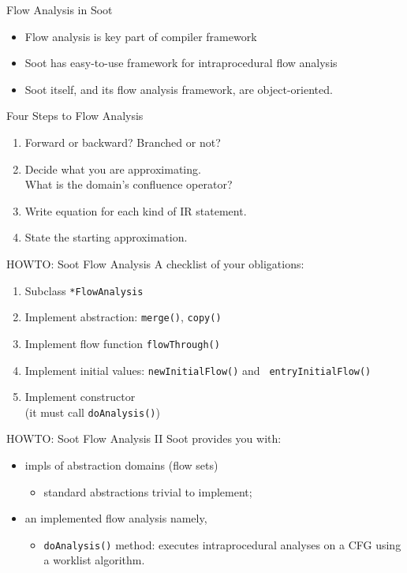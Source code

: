 \begin{slide}{Flow Analysis in Soot}
\vspace*{0.2in}
\begin{itemize}
\item Flow analysis is key part of compiler framework
\item Soot has easy-to-use framework for intraprocedural flow analysis
\item Soot itself, and its flow analysis framework, are object-oriented.
\end{itemize}
\end{slide}

\begin{slide}{Four Steps to Flow Analysis}
\begin{enumerate}
\item Forward or backward?  Branched or not?

\item Decide what you are approximating.\\
What is the domain's confluence operator?

\item Write equation for each kind of IR statement.

\item State the starting approximation.
\end{enumerate}
\end{slide}

\begin{slide}{HOWTO: Soot Flow Analysis}
A checklist of your obligations:
\begin{enumerate}
\item Subclass \verb+*FlowAnalysis+
\item Implement abstraction: {\tt merge()}, {\tt copy()}
\item Implement flow function {\tt flowThrough()}
\item Implement initial values: {\tt newInitialFlow()} and {\tt
entryInitialFlow()}
\item Implement constructor \\ \quad (it must call {\tt doAnalysis()})
\end{enumerate}
\end{slide}

\begin{slide}{HOWTO: Soot Flow Analysis II}
Soot provides you with:
\begin{itemize}
\item impls of abstraction domains (flow sets)
\begin{itemize}
\item standard abstractions trivial to implement;
\end{itemize}
\item an implemented flow analysis namely,
\begin{itemize}
\item {\tt doAnalysis()} method:
executes intraprocedural analyses on a
CFG using a worklist algorithm.
\end{itemize}
\end{itemize}
\end{slide}

